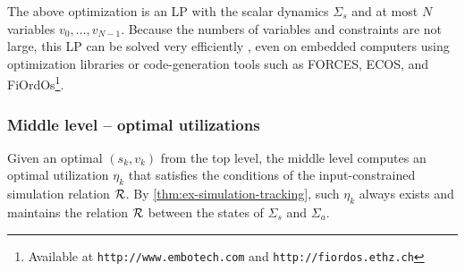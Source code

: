 The above optimization is an LP with the scalar dynamics $\Sigma_{s}$ and at most $N$ variables $v_{0},\dots,v_{N-1}$.
Because the numbers of variables and constraints are not large, this LP can be solved very efficiently \cite{boydetal06co}, even on embedded computers using optimization libraries or code-generation tools such as FORCES, ECOS, and FiOrdOs\footnote{Available at \texttt{http://www.embotech.com} and \texttt{http://fiordos.ethz.ch}}.


\subsubsection{Middle level -- optimal utilizations}

Given an optimal $(s_{k}, v_{k})$ from the top level, the middle level computes an optimal utilization $\eta_{k}$ that satisfies the conditions of the input-constrained simulation relation $\mathcal{R}$.
By \cref{thm:ex-simulation-tracking}, such $\eta_{k}$ always exists and maintains the relation $\mathcal{R}$ between the states of $\Sigma_{s}$ and $\Sigma_{a}$.


